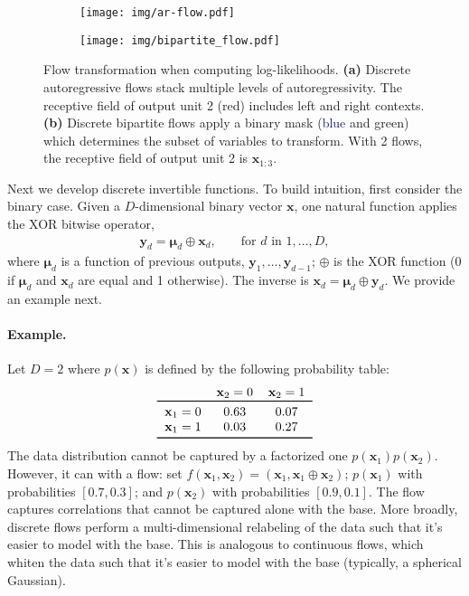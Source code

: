 \documentclass{article}
\newcommand{\mathbold}[1]{\ensuremath{\boldsymbol{\mathbf{#1}}}}
\newcommand{\red}[1]{\textcolor{BrickRed}{#1}}
\newcommand{\green}[1]{\textcolor{OliveGreen}{#1}}
\newcommand{\blue}[1]{\textcolor{MidnightBlue}{#1}}
\newcommand{\nestedmathbold}[1]{{\mathbold{#1}}}
\newcommand{\mbx}{\nestedmathbold{x}}
\newcommand{\mby}{\nestedmathbold{y}}
\newcommand{\mbmu}{\nestedmathbold{\mu}}
\begin{document}
\begin{figure}[t!]
\centering
\begin{subfigure}[t]{0.3\textwidth}
\centering
\texttt{[image: img/ar-flow.pdf]}
\end{subfigure}\hspace{5em}\begin{subfigure}[t]{0.3\textwidth}
\centering
\texttt{[image: img/bipartite\_flow.pdf]}
\end{subfigure}\hfill \caption{Flow transformation when computing log-likelihoods.
\textbf{(a)} Discrete autoregressive flows stack multiple levels of autoregressivity.
The receptive field of output unit 2 (\red{red}) includes left and right contexts.
\textbf{(b)} Discrete bipartite flows apply a binary mask (\blue{blue} and \green{green}) which determines the subset of variables to transform.
With 2 flows, the receptive field of output unit 2 is $\mbx_{1:3}$.
}
\label{fig:flow-transformations}
\end{figure}

Next we develop discrete invertible functions. To build intuition, first consider the binary case.
Given a $D$-dimensional binary vector $\mbx$, one natural function applies the XOR bitwise operator,
\begin{align*}
\mby_d = \mbmu_d \oplus \mbx_d, && \text{ for } d \text{ in } 1, \dots, D,
\end{align*}
where $\mbmu_d$ is a function of previous outputs, $\mby_1,\ldots,\mby_{d-1}$; $\oplus$ is the XOR function (0 if $\mbmu_d$ and $\mbx_d$ are equal and 1 otherwise).
The inverse is $\mbx_d = \mbmu_d \oplus \mby_d$. We provide an example next.

\paragraph{Example.}
Let $D=2$ where $p(\mbx)$ is defined by the following probability table:
\begin{equation*}
\begin{tabular}{ccc}
& $\mbx_2=0$ & $\mbx_2=1$ \\  \toprule
$\mbx_1=0$ & 0.63 & 0.07 \\
$\mbx_1=1$ & 0.03 & 0.27 \\
\bottomrule
\end{tabular}
\end{equation*}
The data distribution cannot be captured by a factorized one $p(\mbx_1)p(\mbx_2)$. However, it can with a flow: set $f(\mbx_1, \mbx_2) = (\mbx_1, \mbx_1 \oplus \mbx_2)$;
$p(\mbx_1)$ with probabilities $[0.7, 0.3]$; and $p(\mbx_2)$ with probabilities $[0.9, 0.1]$.
The flow captures correlations that cannot be captured alone with the base.
More broadly, discrete flows perform a multi-dimensional relabeling of the data
such that it's easier to model with the base. This is analogous to continuous flows, which whiten the data such that it's easier to model with the base (typically, a spherical Gaussian).
\end{document}
